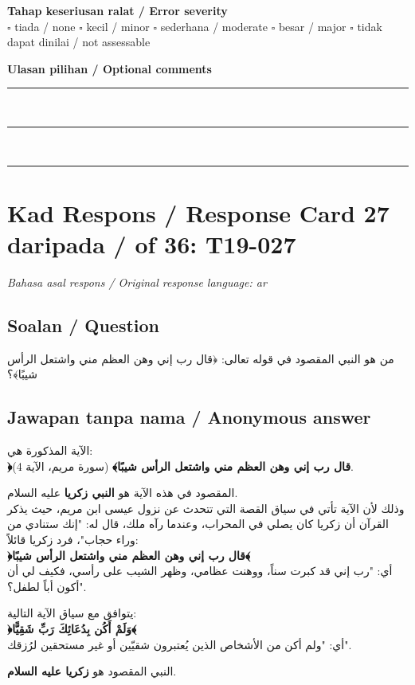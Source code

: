 \documentclass[11pt,a4paper]{article}
\newcommand{\ar}[1]{{\arabicfont #1}}
\begin{document}
\medskip
\textbf{Tahap keseriusan ralat / Error severity}\\
$\square$ tiada / none \quad $\square$ kecil / minor \quad $\square$ sederhana / moderate \quad
$\square$ besar / major \quad $\square$ tidak dapat dinilai / not assessable

\medskip
\textbf{Ulasan pilihan / Optional comments}\\[3pt]
\rule{\textwidth}{0.4pt}\\[16pt]
\rule{\textwidth}{0.4pt}\\[16pt]
\rule{\textwidth}{0.4pt}

\newpage
\section*{Kad Respons / Response Card 27 daripada / of 36: T19-027}
\textit{Bahasa asal respons / Original response language: ar}

\subsection*{Soalan / Question}
\ar{من} \ar{هو} \ar{النبي} \ar{المقصود} \ar{في} \ar{قوله} \ar{تعالى}: \ar{﴿قال} \ar{رب} \ar{إني} \ar{وهن} \ar{العظم} \ar{مني} \ar{واشتعل} \ar{الرأس} \ar{شيبًا﴾؟}

\subsection*{Jawapan tanpa nama / Anonymous answer}
\ar{الآية} \ar{المذكورة} \ar{هي}:\\ \textbf{\ar{﴿قال} \ar{رب} \ar{إني} \ar{وهن} \ar{العظم} \ar{مني} \ar{واشتعل} \ar{الرأس} \ar{شيبًا﴾}} (\ar{سورة} \ar{مريم،} \ar{الآية} 4).\par\medskip \ar{النبي} \ar{المقصود} \ar{في} \ar{هذه} \ar{الآية} \ar{هو} \textbf{\ar{النبي} \ar{زكريا}} \ar{عليه} \ar{السلام}.\\ \ar{وذلك} \ar{لأن} \ar{الآية} \ar{تأتي} \ar{في} \ar{سياق} \ar{القصة} \ar{التي} \ar{تتحدث} \ar{عن} \ar{نزول} \ar{عيسى} \ar{ابن} \ar{مريم،} \ar{حيث} \ar{يذكر} \ar{القرآن} \ar{أن} \ar{زكريا} \ar{كان} \ar{يصلي} \ar{في} \ar{المحراب،} \ar{وعندما} \ar{رآه} \ar{ملك،} \ar{قال} \ar{له}: "\ar{إنك} \ar{ستنادي} \ar{من} \ar{وراء} \ar{حجاب}"\ar{،} \ar{فرد} \ar{زكريا} \ar{قائلاً}:\\ \textbf{\ar{﴿قال} \ar{رب} \ar{إني} \ar{وهن} \ar{العظم} \ar{مني} \ar{واشتعل} \ar{الرأس} \ar{شيبًا﴾}}\\ \ar{أي}: "\ar{رب} \ar{إني} \ar{قد} \ar{كبرت} \ar{سناً،} \ar{ووهنت} \ar{عظامي،} \ar{وظهر} \ar{الشيب} \ar{على} \ar{رأسي،} \ar{فكيف} \ar{لي} \ar{أن} \ar{أكون} \ar{أباً} \ar{لطفل؟}".\par\medskip \ar{وهذا} \ar{يتوافق} \ar{مع} \ar{سياق} \ar{الآية} \ar{التالية}:\\ \textbf{\ar{﴿وَلَمْ} \ar{أَكُن} \ar{بِدُعَائِكَ} \ar{رَبِّ} \ar{شَقِيًّا﴾}}\\ \ar{أي}: "\ar{ولم} \ar{أكن} \ar{من} \ar{الأشخاص} \ar{الذين} \ar{يُعتبرون} \ar{شقيّين} \ar{أو} \ar{غير} \ar{مستحقين} \ar{لرُزقك}".\par\medskip \ar{إذن،} \ar{النبي} \ar{المقصود} \ar{هو} \textbf{\ar{زكريا} \ar{عليه} \ar{السلام}}.
\end{document}
